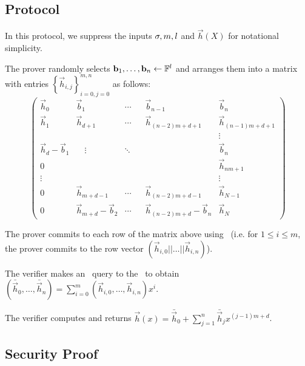 \subsection{Protocol}

In this protocol, we suppress the inputs $\mathsf{\sigma},m,l$ and $\vec{h}(X)$ for notational simplicity.

\begin{description} \label{protpolycommit}
\item[$\textbf{P}_\mathrm{PC}(id)$:]
The prover randomly selects $\mathbf{b}_{1},\ldots,\mathbf{b}_{n} \gets \mathbb{F}^l$ and arranges them into a matrix with entries $\left\{\vec{h}_{i,j}\right\}_{i=0,j=0}^{m,n}$ as follows:
$$\left(\begin{array}{lllll}
\vec{h}_0 & \vec{b}_{1} & \cdots & \vec{b}_{n-1} & \vec{b}_n \\
\vec{h}_1 & \vec{h}_{d+1} & \cdots & \vec{h}_{(n-2)m+d+1} & \vec{h}_{(n-1)m+d+1}\\
&&&& \vdots \\
\vec{h}_d-\vec{b}_1 & \quad \vdots & \ddots \quad & & \vec{b}_n\\
0 &&&& \vec{h}_{nm+1}\\
\vdots &&&& \vdots  \\
0 & \vec{h}_{m+d-1}  & \cdots  & \vec{h}_{(n-2)m+d-1} & \vec{h}_{N-1} \\
0 & \vec{h}_{m+d}-\vec{b}_2 & \cdots & \vec{h}_{(n-2)m+d}-\vec{b}_n & \vec{h}_{N}
\end{array} \right)$$

The prover commits to each row of the matrix above using \ILCcommit\ (i.e. for $1 \leq i \leq m$, the prover commits to the row vector $(\vec{h}_{i,0}||\ldots||\vec{h}_{i,n})$).

\item[$\textbf{V}_\mathrm{PC}(x,id)$:]

The verifier makes an \ILCopen\ query to the \ILC\ to obtain $(\bar{\vec{h}}_0,\ldots,\bar{\vec{h}}_n) = \sum_{i=0}^{m} (\vec{h}_{i,0},\ldots,\vec{h}_{i,n}) x^i$.

The verifier computes and returns $\vec{h}(x) = \bar{\vec{h}}_0+\sum_{j=1}^{n} \bar{\vec{h}}_{j} x^{(j-1)m+d}$.

\end{description}

\subsection{Security Proof}

